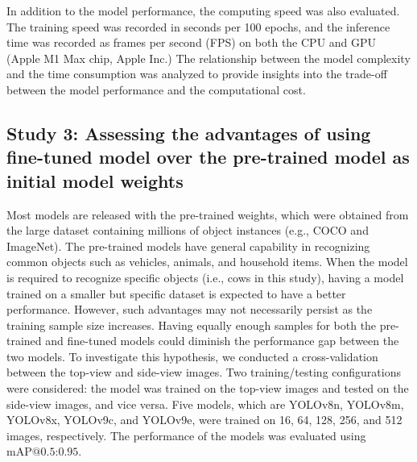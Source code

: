 In addition to the model performance, the computing speed was also evaluated. The training speed was recorded in seconds per 100 epochs, and the inference time was recorded as frames per second (FPS) on both the CPU and GPU (Apple M1 Max chip, Apple Inc.) The relationship between the model complexity and the time consumption was analyzed to provide insights into the trade-off between the model performance and the computational cost.

\subsection*{Study 3: Assessing the advantages of using fine-tuned model over the pre-trained model as initial model weights}

Most models are released with the pre-trained weights, which were obtained from the large dataset containing millions of object instances (e.g., COCO\citep{} and ImageNet\citep{}). The pre-trained models have general capability in recognizing common objects such as vehicles, animals, and household items. When the model is required to recognize specific objects (i.e., cows in this study), having a model trained on a smaller but specific dataset is expected to have a better performance. However, such advantages may not necessarily persist as the training sample size increases. Having equally enough samples for both the pre-trained and fine-tuned models could diminish the performance gap between the two models. To investigate this hypothesis, we conducted a cross-validation between the top-view and side-view images. Two training/testing configurations were considered: the model was trained on the top-view images and tested on the side-view images, and vice versa. Five models, which are YOLOv8n, YOLOv8m, YOLOv8x, YOLOv9c, and YOLOv9e, were trained on 16, 64, 128, 256, and 512 images, respectively. The performance of the models was evaluated using $\text{mAP@{0.5:0.95}}$. 





